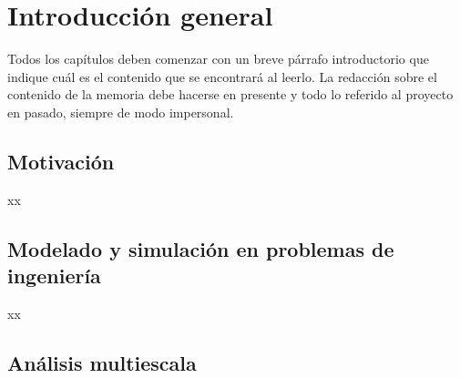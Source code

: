 
\chapter{Introducción general} %

\label{Chapter1} %
\label{IntroGeneral}

Todos los capítulos deben comenzar con un breve párrafo introductorio que indique cuál es el contenido que se encontrará al leerlo.  La redacción sobre el contenido de la memoria debe hacerse en presente y todo lo referido al proyecto en pasado, siempre de modo impersonal.


\newcommand{\keyword}[1]{\textbf{#1}}
\newcommand{\tabhead}[1]{\textbf{#1}}
\newcommand{\code}[1]{\texttt{#1}}
\newcommand{\file}[1]{\texttt{\bfseries#1}}
\newcommand{\option}[1]{\texttt{\itshape#1}}
\newcommand{\grados}{$^{\circ}$}



\section{Motivación}

xx


\section{Modelado y simulación en problemas de ingeniería}

xx


\section{Análisis multiescala}

